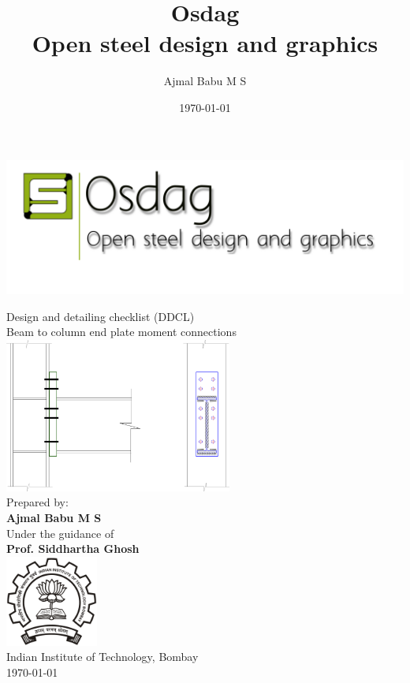 \documentclass[11.5pt,a4paper,oneside]{report}
\begin{document}
	\title{Osdag\\ Open steel design and graphics}
	\author{Ajmal Babu M S}
	\date{\today}
\pagestyle{fancy}
\lhead{}
\chead{}
\cfoot{}
\rfoot{\thepage}
\renewcommand{\headrulewidth}{2pt}
\renewcommand{\footrulewidth}{1pt}
\newcommand{\univ}{Indian Institute of Technology, Bombay}
\begin{titlepage}
	\begin{center}
		\begin{center}
			\includegraphics {logoOsdag.png}
		\end{center}
	
			{\LARGE {Design and detailing checklist (DDCL)}}\\
			\vspace{1cm}
			{\LARGE {Beam to column end plate  moment connections}} \\
			\vspace{1cm}		
			\includegraphics[height=2in]{view.png} \\	
			\vspace{3cm}
			 {\small {Prepared by:}} \\
			 {\Large \textbf {Ajmal Babu M S}} \\	
			\vspace{0.5cm}	
			{\small {Under the guidance of} }\\
			{\Large \textbf {Prof. Siddhartha Ghosh}} \\	
			\vspace{1cm}
			\centering
			\includegraphics[width=1.2in]{logo.png} \\	
 			\vspace{0.5cm}
			{\univ} \\ 
			\vspace{0.15cm}		
			{\today}
	\end{center}
\end{titlepage}
\end{document}
